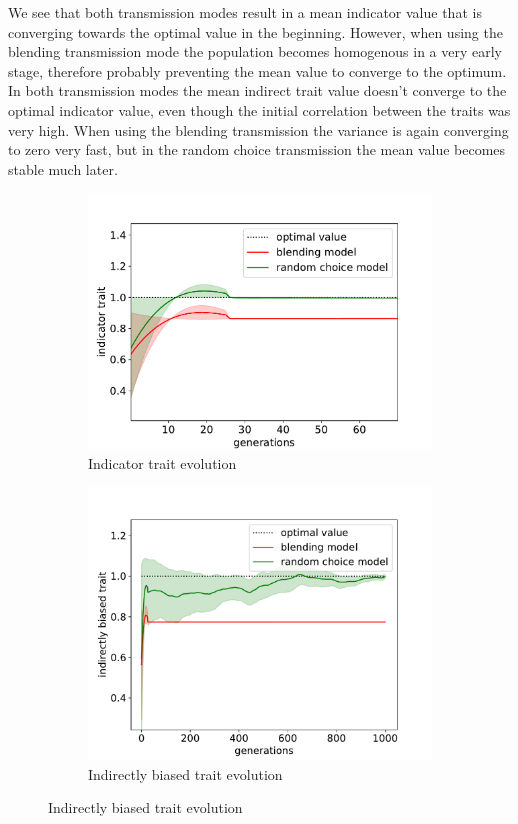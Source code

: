\documentclass[11pt]{article}
\begin{document}
 We see that both transmission modes result in a mean indicator value that is converging towards the optimal value in the beginning. %
 However, when using the blending transmission mode the population becomes homogenous in a very early stage, therefore probably preventing the mean value to converge to the optimum. %
In both transmission modes the mean indirect trait value doesn't converge to the optimal indicator value, even though the initial correlation between the traits was very high. %
When using the blending transmission the variance is again converging to zero very fast, but in the random choice transmission the mean value becomes stable much later.\\ %

\begin{figure}
  \begin{subfigure}[b]{\linewidth}
  \caption{Indicator trait evolution}
    \includegraphics[width=\linewidth]{../../graphs/blending-vs-random/indicator_21_diffInit_1000x1000_09Corr.pdf}
  \end{subfigure}
  \begin{subfigure}[b]{\linewidth}
  \caption{Indirectly biased trait evolution}
    \includegraphics[width=\linewidth]{../../graphs/blending-vs-random/indirect_21_diffInit_1000x1000_09Corr.pdf}

\end{subfigure}
\end{figure}
\end{document}
